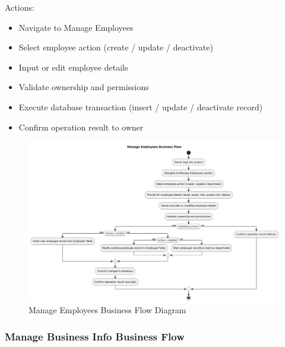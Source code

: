 \documentclass[]{VUMIFTemplateClass}
\begin{document}
Actions:
\begin{itemize}
\setlength{\itemsep}{2pt}
\setlength{\parskip}{0pt}
\setlength{\parsep}{0pt}
\item Navigate to Manage Employees
\item Select employee action (create / update / deactivate)
\item Input or edit employee details
\item Validate ownership and permissions
\item Execute database transaction (insert / update / deactivate record)
\item Confirm operation result to owner
\end{itemize}
\begin{figure}[H]
    \centering
    \includegraphics[width=1\textwidth]{docs/ps-design/design-document/diagrams/business/bpmn_employee_manage.png}
    \caption{Manage Employees Business Flow Diagram}
    \label{fig:employee_manage_flow}
\end{figure}

\subsubsection{Manage Business Info Business Flow}
\end{document}
